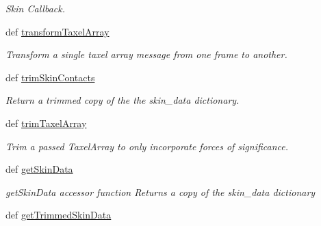 \begin{DoxyCompactItemize}
\begin{DoxyCompactList}\small\item\em \-Skin \-Callback. \end{DoxyCompactList}\item 
def \hyperlink{classhrl__haptic__mpc_1_1skin__client_1_1_taxel_array_client_afa86c6322351c5ce4aaf7fa5f60f3f32}{transform\-Taxel\-Array}
\begin{DoxyCompactList}\small\item\em \-Transform a single taxel array message from one frame to another. \end{DoxyCompactList}\item 
def \hyperlink{classhrl__haptic__mpc_1_1skin__client_1_1_taxel_array_client_aaf72aa3c08a5c4755317423313014874}{trim\-Skin\-Contacts}
\begin{DoxyCompactList}\small\item\em \-Return a trimmed copy of the the skin\-\_\-data dictionary. \end{DoxyCompactList}\item 
def \hyperlink{classhrl__haptic__mpc_1_1skin__client_1_1_taxel_array_client_a92bcb6cee728e231dd4aae2975bcdfe2}{trim\-Taxel\-Array}
\begin{DoxyCompactList}\small\item\em \-Trim a passed \-Taxel\-Array to only incorporate forces of significance. \end{DoxyCompactList}\item 
\hypertarget{classhrl__haptic__mpc_1_1skin__client_1_1_taxel_array_client_a4caa1c9035956164b70e85a34d069ae4}{def \hyperlink{classhrl__haptic__mpc_1_1skin__client_1_1_taxel_array_client_a4caa1c9035956164b70e85a34d069ae4}{get\-Skin\-Data}}\label{classhrl__haptic__mpc_1_1skin__client_1_1_taxel_array_client_a4caa1c9035956164b70e85a34d069ae4}

\begin{DoxyCompactList}\small\item\em get\-Skin\-Data accessor function \-Returns a copy of the skin\-\_\-data dictionary \end{DoxyCompactList}\item 
\hypertarget{classhrl__haptic__mpc_1_1skin__client_1_1_taxel_array_client_a4135b7523bd1e3b318853a3bf0e54e6b}{def \hyperlink{classhrl__haptic__mpc_1_1skin__client_1_1_taxel_array_client_a4135b7523bd1e3b318853a3bf0e54e6b}{get\-Trimmed\-Skin\-Data}}\label{classhrl__haptic__mpc_1_1skin__client_1_1_taxel_array_client_a4135b7523bd1e3b318853a3bf0e54e6b}


\end{DoxyCompactItemize}
